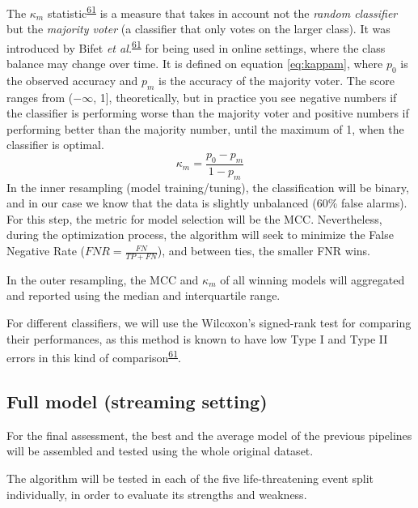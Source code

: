 \documentclass[12pt,twoside]{fmupthesis}
\begin{document}
The \(\kappa_m\) statistic\textsuperscript{\protect\hyperlink{ref-Bifet2015}{61}} is a measure that takes in account not the \emph{random classifier}
but the \emph{majority voter} (a classifier that only votes on the larger class). It was introduced by
Bifet \emph{et al.}\textsuperscript{\protect\hyperlink{ref-Bifet2015}{61}} for being used in online settings, where the class balance may change
over time. It is defined on equation \eqref{eq:kappam}, where \(p_0\) is the observed accuracy and
\(p_m\) is the accuracy of the majority voter. The score ranges from (\(-\infty\), 1{]}, theoretically,
but in practice you see negative numbers if the classifier is performing worse than the majority voter
and positive numbers if performing better than the majority number, until the maximum of 1, when the
classifier is optimal.
\begin{equation}
\kappa_m = \frac{p_0 - p_m}{1 - p_m} \label{eq:kappam}
\end{equation}
In the inner resampling (model training/tuning), the classification will be binary, and in our case
we know that the data is slightly unbalanced (60\% false alarms). For this step, the metric for model
selection will be the MCC. Nevertheless, during the optimization process, the algorithm will seek to
minimize the False Negative Rate (\(FNR = \frac{FN}{TP+FN}\)), and between ties, the smaller FNR wins.

In the outer resampling, the MCC and \(\kappa_m\) of all winning models will aggregated and reported
using the median and interquartile range.

For different classifiers, we will use the Wilcoxon's signed-rank test for comparing their performances,
as this method is known to have low Type I and Type II errors in this kind of comparison\textsuperscript{\protect\hyperlink{ref-Bifet2015}{61}}.

\hypertarget{full-model-streaming-setting}{%
\subsection{Full model (streaming setting)}\label{full-model-streaming-setting}}

For the final assessment, the best and the average model of the previous pipelines will be assembled
and tested using the whole original dataset.

The algorithm will be tested in each of the five life-threatening event split individually, in order
to evaluate its strengths and weakness.
\end{document}
